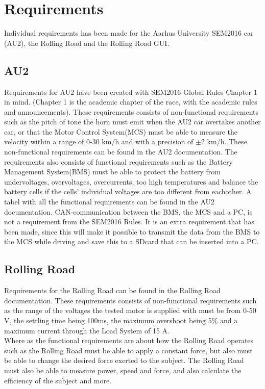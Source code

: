 \chapter{Requirements}
Individual requirements has been made for the Aarhus University SEM2016 car (AU2), the Rolling Road and the Rolling Road GUI.

\section{AU2}
Requirements for AU2 have been created with SEM2016 Global Rules Chapter 1 in mind. (Chapter 1 is the academic chapter of the race, with the academic rules and announcements). These requirements consists of non-functional requirements such as the pitch of tone the horn must emit when the AU2 car overtakes another car, or that the Motor Control System(MCS) must be able to measure the velocity within a range of 0-30 km/h and with a precision of $\pm$2 km/h. These non-functional requirements can be found in the AU2 documentation. The requirements also consists of functional requirements such as the Battery Management System(BMS) must be able to protect the battery from undervoltages, overvoltages, overcurrents, too high temperatures and balance the battery cells if the cells' individual voltages are too different from eachother. A tabel with all the functional requirements can be found in the AU2 documentation. CAN-communication between the BMS, the MCS and a PC, is not a requirement from the SEM2016 Rules. It is an extra requirement that has been made, since this will make it possible to transmit the data from the BMS to the MCS while driving and save this to a SDcard that can be inserted into a PC.

\section{Rolling Road}
Requirements for the Rolling Road can be found in the Rolling Road documentation.
These requirements consists of non-functional requirements such as the range of the voltages the tested motor is supplied with must be from 0-50 V, the settling time being 100ms, the maximum overshoot being 5\% and a maximum current through the Load System of 15 A.\\
Where as the functional requirements are about how the Rolling Road operates such as the Rolling Road must be able to apply a constant force, but also must be able to change the desired force exerted to the subject. The Rolling Road must also be able to measure power, speed and force, and also calculate the efficiency of the subject and more.

